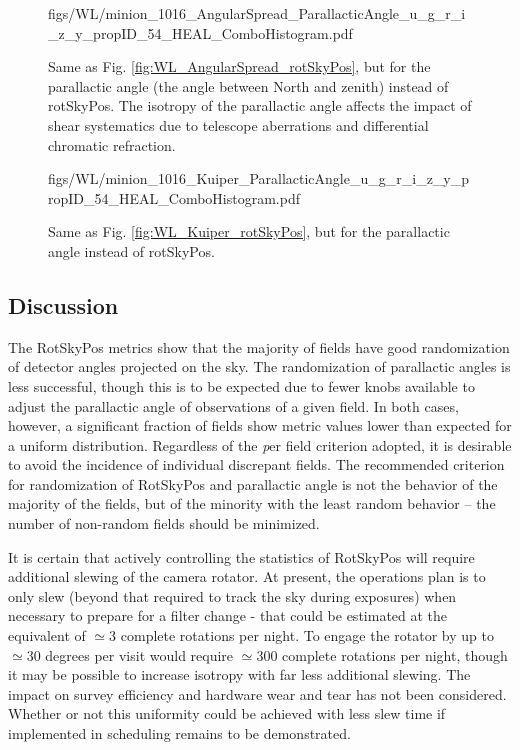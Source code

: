 
\begin{figure}[tbh!]
        {figs/WL/minion_1016_AngularSpread_ParallacticAngle_u_g_r_i_z_y_propID_54_HEAL_ComboHistogram.pdf}
\caption{Same as Fig. \ref{fig:WL_AngularSpread_rotSkyPos}, but for the parallactic angle (the angle
    between North and zenith) instead of rotSkyPos.  The isotropy of the parallactic angle affects
    the impact of shear systematics due to telescope aberrations and differential chromatic
    refraction.}
\label{fig:WL_AngularSpread_ParallacticAngle}
\end{figure}

\begin{figure}[tbh!]
        {figs/WL/minion_1016_Kuiper_ParallacticAngle_u_g_r_i_z_y_propID_54_HEAL_ComboHistogram.pdf}
\caption{Same as Fig. \ref{fig:WL_Kuiper_rotSkyPos}, but for the parallactic angle instead of
    rotSkyPos.}
\label{fig:WL_Kuiper_ParallacticAngle}
\end{figure}


\subsection{Discussion}

The RotSkyPos metrics show that the majority of fields have good randomization of detector angles
projected on the sky.  The randomization of parallactic angles is less successful, though this is to
be expected due to fewer knobs available to adjust the parallactic angle of observations of a given
field.  In both cases, however, a significant fraction of fields show metric values lower than
expected for a uniform distribution.  Regardless of the {\emph per field} criterion adopted, it is
desirable to avoid the incidence of individual discrepant fields.  The recommended criterion for
randomization of RotSkyPos and parallactic angle is not the behavior of the majority of the fields,
but of the minority with the least random behavior -- the number of non-random fields should be
minimized.

It is certain that actively controlling the statistics of RotSkyPos will require additional slewing
of the camera rotator.  At present, the operations plan is to only slew (beyond that required to
track the sky during exposures) when necessary to prepare for a filter change - that could be
estimated at the equivalent of $\simeq 3$ complete rotations per night.  To engage the rotator by up
to $\simeq 30$ degrees per visit would require $\simeq 300$ complete rotations per night, though it
may be possible to increase isotropy with far less additional slewing.  The impact on survey
efficiency and hardware wear and tear has not been considered.  Whether or not this uniformity could
be achieved with less slew time if implemented in scheduling remains to be demonstrated.

